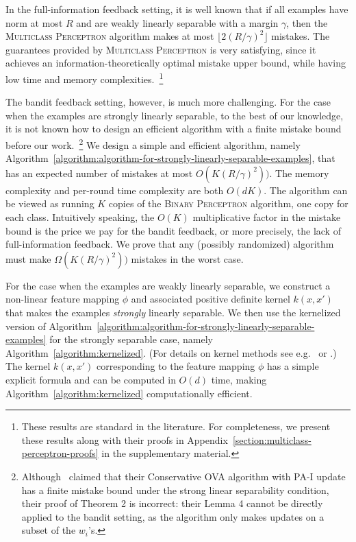 In the full-information feedback setting, it is well known that if all examples
have norm at most $R$ and are weakly linearly separable with a margin $\gamma$,
then the \textsc{Multiclass Perceptron} algorithm makes at most $\lfloor
2(R/\gamma)^2 \rfloor$ mistakes.
The guarantees provided by \textsc{Multiclass
Perceptron} is very satisfying, since it achieves an information-theoretically
optimal mistake upper bound, while having low time and memory
complexities.~\footnote{These results are standard in the literature. For
completeness, we present these results along with their proofs in
Appendix~\ref{section:multiclass-perceptron-proofs} in the supplementary
material.}

The bandit feedback setting, however, is much more challenging. For the case
when the examples are strongly linearly separable, to the best of our knowledge,
it is not known how to design an efficient algorithm with a finite mistake bound
before our work.~\footnote{Although~\cite{Chen-Chen-Zhang-Chen-Zhang-2009}
claimed that their Conservative OVA algorithm with PA-I update has a finite
mistake bound under the strong linear separability condition, their proof of
Theorem 2 is incorrect: their Lemma 4 cannot be directly applied to the bandit
setting, as the algorithm only makes updates on a subset of the $w_i$'s.} We
design a simple and efficient algorithm, namely
Algorithm~\ref{algorithm:algorithm-for-strongly-linearly-separable-examples},
that has an expected number of mistakes at most $O(K (R/\gamma)^2))$.
The memory complexity and per-round time complexity are both $O(dK)$.
The algorithm can be viewed as running $K$ copies of the \textsc{Binary
Perceptron} algorithm, one copy for each class. Intuitively speaking, the $O(K)$
multiplicative factor in the mistake bound is the price we pay for the bandit
feedback, or more precisely, the lack of full-information feedback. We prove
that any (possibly randomized) algorithm must make $\Omega(K (R/\gamma)^2))$
mistakes in the worst case.

For the case when the examples are weakly linearly separable, we construct a
non-linear feature mapping $\phi$ and associated positive definite kernel
$k(x,x')$ that makes the examples \emph{strongly} linearly separable. We then
use the kernelized version of
Algorithm~\ref{algorithm:algorithm-for-strongly-linearly-separable-examples}
for the strongly separable case, namely
Algorithm~\ref{algorithm:kernelized}. (For details on kernel methods see
e.g.~\citet{Scholkopf-Smola-2002} or \citet{Shawe-Taylor-Cristianini-2004}.)
The kernel $k(x,x')$ corresponding to the feature mapping $\phi$ has a simple
explicit formula and can be computed in $O(d)$ time,
making Algorithm~\ref{algorithm:kernelized} computationally efficient.

